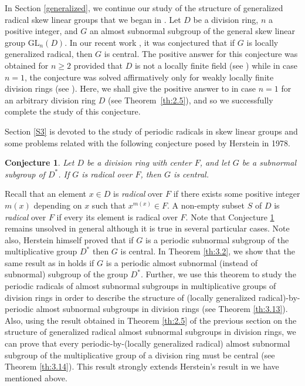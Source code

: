 \documentclass{amsart}
\newtheorem{conjecture}{Conjecture}
\theoremstyle{definition}
\begin{document}
In Section \ref{generalized}, we continue our study of the structure of generalized radical skew linear groups that we began in \cite{Pa_ChuaHai_2026}. Let $D$ be a division ring, $n$ a positive integer, and $G$ an almost subnormal subgroup of the general skew linear group $\mathrm{GL}_n(D)$. In our recent work \cite{Pa_ChuaHai_2026}, it was conjectured \cite[Conjecture 1]{Pa_ChuaHai_2026} that if $G$ is locally generalized radical, then $G$ is central. The positive answer for this conjecture was obtained for $n\ge 2$ provided that $D$ is not a locally finite field (see \cite[Theorem 3.3]{Pa_ChuaHai_2026}) while in case $n=1$, the conjecture was solved affirmatively only for weakly locally finite division rings (see \cite[Theorem 4.11]{Pa_ChuaHai_2026}). Here, we shall give the positive answer to \cite[Conjecture 1]{Pa_ChuaHai_2026} in case $n=1$ for an arbitrary division ring $D$ (see Theorem~\ref{th:2.5}), and so we successfully complete the study of this conjecture. 
	
Section \ref{S3} is devoted to the study of  periodic radicals in skew linear groups and some problems related with the following conjecture posed by Herstein in 1978.
	\begin{conjecture}\label{conj:1}{\rm \cite[Conjecture 3]{Pa_Herstein_1978}}
		Let $D$ be a division ring with center $F$, and let $G$ be a subnormal subgroup of $D^*$. If $G$ is radical over $F$, then $G$ is central.
	\end{conjecture}
    Recall that an element $x\in D$ is \textit{radical} over $F$ if there exists some positive integer $m(x)$ depending on $x$ such that $x^{m(x)}\in F$. A non-empty subset $S$ of $D$ is \textit{radical} over $F$ if every its element is radical over $F$. Note that Conjecture \ref{conj:1} remains unsolved in general although it is true in several particular cases. Note also, Herstein himself \cite[Theorem~8]{Pa_Herstein_1978} proved that if $G$ is a periodic subnormal subgroup of the multiplicative group $D^*$ then $G$ is central. In Theorem \ref{th:3.2}, we show that the same result as in \cite[Theorem~8]{Pa_Herstein_1978} holds if $G$ is a periodic almost subnormal (instead of subnormal) subgroup of the group $D^*$. Further, we use this theorem to study the periodic radicals of almost subnormal subgroups in multiplicative groups of division rings in order to  describe the structure of (locally generalized radical)-by-periodic almost subnormal subgroups in division rings (see Theorem \ref{th:3.13}). Also, using the result obtained in Theorem \ref{th:2.5} of the previous section on the structure of generalized radical almost subnormal subgroups in division rings, we can prove that every periodic-by-(locally generalized radical) almost subnormal subgroup of the multiplicative group of a division ring must be central (see Theorem \ref{th:3.14}). This result strongly extends Herstein's result in \cite[Theorem 8]{Pa_Herstein_1978} we have mentioned above. 
    
\end{document}
